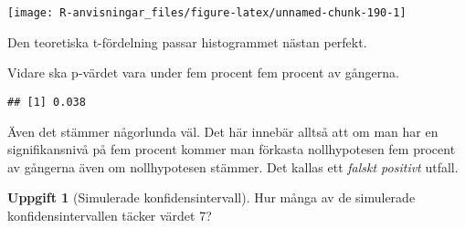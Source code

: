 \documentclass[
]{book}
\newenvironment{Shaded}{\begin{snugshade}}{\end{snugshade}}
\newcommand{\FloatTok}[1]{\textcolor[rgb]{0.00,0.00,0.81}{#1}}
\newcommand{\FunctionTok}[1]{\textcolor[rgb]{0.00,0.00,0.00}{#1}}
\newcommand{\NormalTok}[1]{#1}
\newcommand{\SpecialCharTok}[1]{\textcolor[rgb]{0.00,0.00,0.00}{#1}}
\theoremstyle{definition}
\theoremstyle{definition}
\theoremstyle{definition}
\newtheorem{exercise}{Uppgift}[chapter]
\theoremstyle{definition}
\theoremstyle{remark}
\begin{document}
\begin{center}\texttt{[image: R-anvisningar\_files/figure-latex/unnamed-chunk-190-1]} \end{center}

Den teoretiska t-fördelning passar histogrammet nästan perfekt.

Vidare ska p-värdet vara under fem procent fem procent av gångerna.

\begin{Shaded}
\end{Shaded}

\begin{verbatim}
## [1] 0.038
\end{verbatim}

Även det stämmer någorlunda väl. Det här innebär alltså att om man har en signifikansnivå på fem procent kommer man förkasta nollhypotesen fem procent av gångerna även om nollhypotesen stämmer. Det kallas ett \emph{falskt positivt} utfall.

\begin{exercise}[Simulerade konfidensintervall]
Hur många av de simulerade konfidensintervallen täcker värdet 7?
\end{exercise}
\end{document}
